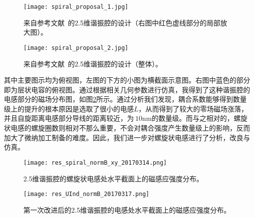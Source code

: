             \begin{figure}
                \begin{minipage}[b]{0.4\textwidth}
                    \centering
                    \texttt{[image: spiral\_proposal\_1.jpg]}
                    \caption{来自参考文献~的2.5维谐振腔的设计（右图中红色虚线部分的局部放大图）。}
                    \label{fig:spiral_proposal_1}
                \end{minipage}%
                \hspace*{\fill}
                \begin{minipage}[b]{0.5\textwidth}
                    \centering
                    \texttt{[image: spiral\_proposal\_2.jpg]}
                    \caption{来自参考文献~的2.5维谐振腔的设计（整体）。}
                    \label{fig:spiral_proposal_2}
                \end{minipage}
            \end{figure}
            其中主要图示均为俯视图，左图的下方的小图为横截面示意图。右图中蓝色的部分即为层状电容的俯视图。通过根据相关几何参数进行仿真，我得到了这种谐振腔的电感部分的磁场分布图，如图\ref{fig:res_spiral_normB_xy_20170314}所示。通过分析我们发现，耦合系数能够得到数量级上的提升的根本原因是选取了很小的电感$L$，从而得到了较大的零场磁场涨落，并且自旋距离电感部分导线的距离较近，为$~10$nm的数量级。而与之相对的，螺旋状电感的螺旋圈数则相对不那么重要，不会对耦合强度产生数量级上的影响，反而加大了微纳加工制备的难度。因此，我们进一步对螺旋状电感进行了分析，改良与仿真。

            \begin{figure}[h]
                \centering
                \texttt{[image: res\_spiral\_normB\_xy\_20170314.png]}
                \caption{2.5维谐振腔的螺旋状电感处水平截面上的磁感应强度分布。}
                \label{fig:res_spiral_normB_xy_20170314}
            \end{figure}

            \begin{figure}[h]
                \centering
                \texttt{[image: res\_UInd\_normB\_20170317.png]}
                \caption{第一次改进后的2.5维谐振腔的电感处水平截面上的磁感应强度分布。}
                \label{fig:res_UInd_normB_20170317}
            \end{figure}


